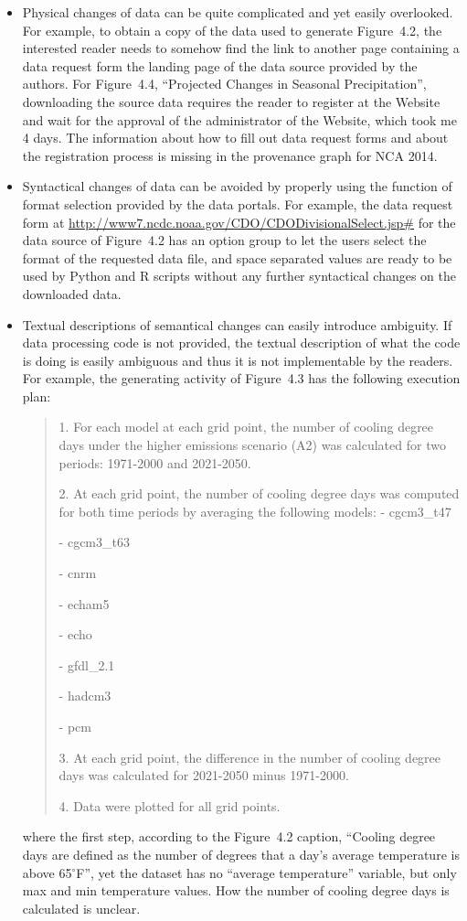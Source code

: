 \begin{itemize}
	\item Physical changes of data can be quite complicated and yet easily overlooked. For example, to obtain a copy of the data used to generate Figure~4.2, the interested reader needs to somehow find the link to another page containing a data request form the landing page of the data source provided by the authors. For Figure~4.4, ``Projected Changes in Seasonal Precipitation'', downloading the source data requires the reader to register at the Website and wait for the approval of the administrator of the Website, which took me 4 days. The information about how to fill out data request forms and about the registration process is missing in the provenance graph for NCA 2014.
	\item Syntactical changes of data can be avoided by properly using the function of format selection provided by the data portals. For example, the data request form at \url{http://www7.ncdc.noaa.gov/CDO/CDODivisionalSelect.jsp#} for the data source of Figure~4.2 has an option group to let the users select the format of the requested data file, and space separated values are ready to be used by Python and R scripts without any further syntactical changes on the downloaded data.
	\item Textual descriptions of semantical changes can easily introduce ambiguity. If data processing code is not provided, the textual description of what the code is doing is easily ambiguous and thus it is not implementable by the readers. For example, the generating activity of Figure~4.3 has the following execution plan: 
	\begin{quotation}
		1. For each model at each grid point, the number of cooling degree days under the higher emissions scenario (A2) was calculated for two periods: 1971-2000 and 2021-2050. 
		
		2. At each grid point, the number of cooling degree days was computed for both time periods by averaging the following models:
		- cgcm3\_t47
		
		- cgcm3\_t63
		
		- cnrm
		
		- echam5
		
		- echo
		
		- gfdl\_2.1
		
		- hadcm3
		
		- pcm
		
		3. At each grid point, the difference in the number of cooling degree days was calculated for 2021-2050 minus 1971-2000.
		
		4. Data were plotted for all grid points.
		
	\end{quotation}
	where the first step, according to the Figure~4.2 caption, ``Cooling degree days are defined as the number of degrees that a day's average temperature is above 65$^{\circ}$F'', yet the dataset has no ``average temperature'' variable, but only max and min temperature values. How the number of cooling degree days is calculated is unclear.
\end{itemize}

